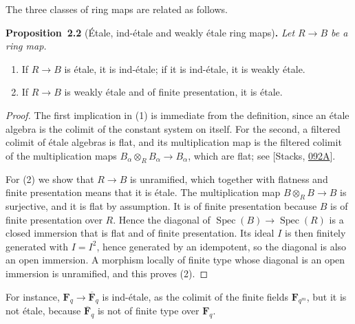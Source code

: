 \documentclass[11pt]{article}
\newenvironment{bpstatement}[2]{\par\addvspace{0.6\baselineskip}\noindent\textbf{#1}#2\textbf{.}\enspace\ignorespaces}
  {\par\addvspace{0.4\baselineskip}}
\newenvironment{bpstatementit}[2]{\begin{bpstatement}{#1}{#2}\itshape\ignorespaces}{\end{bpstatement}}
\begin{document}
\label{bp6}%
The three classes of ring maps are related as follows.

\label{bp7}%
\begin{bpstatementit}{Proposition~2.2}{ (Étale, ind-étale and weakly étale ring maps)}
Let \(R\to B\) be a ring map.

\begin{enumerate}
\item If \(R\to B\) is étale, it is ind-étale; if it is ind-étale, it is weakly étale.
\item If \(R\to B\) is weakly étale and of finite presentation, it is étale.
\end{enumerate}
\end{bpstatementit}

\begin{proof}[{Proof}]\label{bp8}%
The first implication in (1) is immediate from the definition, since an étale algebra is the colimit of the constant system on itself. For the second, a filtered colimit of étale algebras is flat, and its multiplication map is the filtered colimit of the multiplication maps \(B_\alpha\otimes_RB_\alpha\to B_\alpha\), which are flat; see [Stacks, \href{https://stacks.math.columbia.edu/tag/092A}{092A}].

For (2) we show that \(R\to B\) is unramified, which together with flatness and finite presentation means that it is étale. The multiplication map \(B\otimes_RB\to B\) is surjective, and it is flat by assumption. It is of finite presentation because \(B\) is of finite presentation over \(R\). Hence the diagonal of \(\operatorname{Spec}(B)\to\operatorname{Spec}(R)\) is a closed immersion that is flat and of finite presentation. Its ideal \(I\) is then finitely generated with \(I=I^2\), hence generated by an idempotent, so the diagonal is also an open immersion. A morphism locally of finite type whose diagonal is an open immersion is unramified, and this proves (2).
\end{proof}

\label{bp9}%
For instance, \(\mathbf F_q\to\overline{\mathbf F}_q\) is ind-étale, as the colimit of the finite fields \(\mathbf F_{q^m}\), but it is not étale, because \(\overline{\mathbf F}_q\) is not of finite type over \(\mathbf F_q\).
\end{document}
